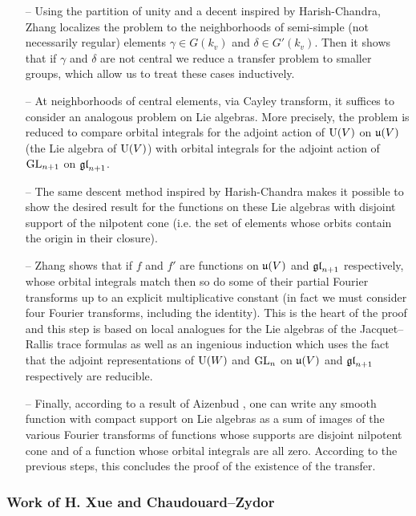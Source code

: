 \begin{itemize}
    \item[--] Using the partition of unity and a decent inspired by Harish-Chandra, Zhang localizes the problem to the neighborhoods of semi-simple (not necessarily regular) elements $\gamma \in G(k_v)$ and $\delta \in G'(k_v)$.
    Then it shows that if $\gamma$ and $\delta$ are not central we reduce a transfer problem to smaller groups, which allow us to treat these cases inductively.

    \item[--] At neighborhoods of central elements, via Cayley transform, it suffices to consider an analogous problem on Lie algebras.
    More precisely, the problem is reduced to compare orbital integrals for the adjoint action of $\mathrm{U}(V)$ on $\mathfrak{u}(V)$ (the Lie algebra of $\mathrm{U}(V)$) with orbital integrals for the adjoint action of $\mathrm{GL}_{n+1}$ on $\mathfrak{gl}_{n+1}$.

    \item[--] The same descent method inspired by Harish-Chandra makes it possible to show the desired result for the functions on these Lie algebras with disjoint support of the nilpotent cone (i.e. the set of elements whose orbits contain the origin in their closure).

    \item[--] Zhang shows that if $f$ and $f'$ are functions on $\mathfrak{u}(V)$ and $\mathfrak{gl}_{n+1}$ respectively, whose orbital integrals match then so do some of their partial Fourier transforms up
    to an explicit multiplicative constant (in fact we must consider four Fourier transforms, including the identity).
    This is the heart of the proof and this step is based on local analogues for the Lie algebras of the Jacquet--Rallis trace formulas as well as an ingenious induction which uses the fact that the adjoint representations of $\mathrm{U}(W)$ and $\mathrm{GL}_n$ on $\mathfrak{u}(V)$ and $\mathfrak{gl}_{n+1}$ respectively are reducible.
    
    \item[--] Finally, according to a result of Aizenbud \cite{aizenbud2013partial}, one can write any smooth function with compact support on Lie algebras as a sum of images of the various Fourier transforms of functions whose supports are disjoint  nilpotent cone and of a function whose orbital integrals are all zero.
    According to the previous steps, this concludes the proof of the existence of the transfer.
\end{itemize}


\subsubsection{Work of H. Xue and Chaudouard--Zydor}

